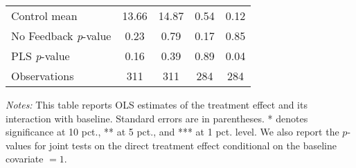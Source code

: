 \begin{table}[ht]
{\begin{threeparttable}
\begin{tabular}{l*{4}{c}}
Control mean    &    13.66         &    14.87         &     0.54         &     0.12         \\
No Feedback \emph{p}-value&     0.23         &     0.79         &     0.17         &     0.85         \\
PLS \emph{p}-value&     0.16         &     0.39         &     0.89         &     0.04         \\
Observations    &      311         &      311         &      284         &      284         \\
\bottomrule \end{tabular} \begin{tablenotes}[flushleft] \footnotesize \item \emph{Notes:} This table reports OLS estimates of the treatment effect and its interaction with baseline. Standard errors are in parentheses. * denotes significance at 10 pct., ** at 5 pct., and *** at 1 pct. level. We also report the \(p\)-values for joint tests on the direct treatment effect conditional on the baseline covariate $= 1$. \end{tablenotes} \end{threeparttable} } \end{table}

